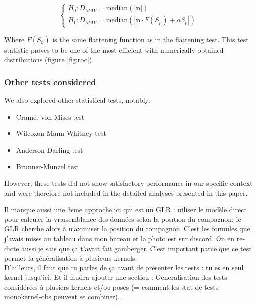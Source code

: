 \documentclass{article}
\newcommand{\dm}[1]{{\color{mulberry} #1}}
\begin{document}
$$
\begin{cases}
H_0 : D_{MAV} = \text{median}(|\mathbf{n}|)\\
H_1 : D_{MAV} = \text{median}(|\mathbf{n} \cdot F(S_p) + \alpha S_p|)
\end{cases}
$$

Where $F(S_p)$ is the same flattening function as in the flattening test. This test statistic proves to be one of the most efficient with numerically obtained distributions (figure \ref{fig:roc}).

\subsubsection{Other tests considered}\label{sec:other_tests}
We also explored other statistical tests, notably:
\begin{itemize}
    \item Cramér-von Mises test
    \item Wilcoxon-Mann-Whitney test
    \item Anderson-Darling test
    \item Brunner-Munzel test
\end{itemize}

However, these tests did not show satisfactory performance in our specific context and were therefore not included in the detailed analyses presented in this paper.



\dm{Il manque aussi une 3eme approche  ici qui est un GLR : utliser le modèle direct pour calculer la vraisemblance des données selon la position du compagnon; le GLR cherche alors à maximiser la position du compagnon. C'est les formules que j'avais mises au tableau dans mon bureau et la photo est sur discord. On en re-dicte aussi je sais que ça t'avait fait gamberger. C'est important parce que ce test permet la généralisation à plusieurs kernels. \\
D'ailleurs, il faut que tu parles de ça avant de présenter les tests : tu es en seul kernel jusqu'ici. Et il faudra ajouter  une section : Generalisation des tests considérées à plusiers kernels et/ou poses (= comment les stat de tests monokernel-obs peuvent se combiner).}



\end{document}
